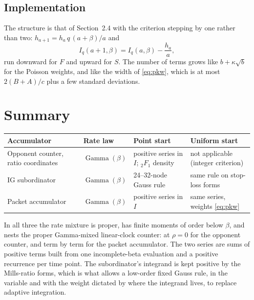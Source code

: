 \documentclass[11pt]{article}
\newcommand{\Gam}{\operatorname{Gamma}}
\newcommand{\Ireg}{I}
\begin{document}
\subsection{Implementation}
The structure is that of Section~2.4 with the criterion stepping by one rather than two: $h_{a+1}=h_a\,q\,(a+\beta)/a$ and
\[
\Ireg_q(a+1,\beta)=\Ireg_q(a,\beta)-\frac{h_a}{a},
\]
run downward for $F$ and upward for $S$. The number of terms grows like $b+\kappa\sqrt b$ for the Poisson weights, and like the width of \eqref{eq:pkw}, which is at most $2(B+A)/c$ plus a few standard deviations.

\section{Summary}
\begin{center}
\small\begin{tabular}{@{}l l p{4.2cm} p{3.6cm}@{}}
\toprule
Accumulator & Rate law & Point start & Uniform start\\
\midrule
Opponent counter, ratio coordinates & $\Gam(\beta)$ & positive series in $\Ireg$; ${}_2F_1$ density & not applicable (integer criterion)\\
IG subordinator & $\Gam(\beta)$ & 24--32-node Gauss rule & same rule on stop-loss forms\\
Packet accumulator & $\Gam(\beta)$ & positive series in $\Ireg$ & same series, weights \eqref{eq:pkw}\\
\bottomrule
\end{tabular}
\end{center}
In all three the rate mixture is proper, has finite moments of order below $\beta$, and nests the proper Gamma-mixed linear-clock counter: at $\rho=0$ for the opponent counter, and term by term for the packet accumulator. The two series are sums of positive terms built from one incomplete-beta evaluation and a positive recurrence per time point. The subordinator's integrand is kept positive by the Mills-ratio forms, which is what allows a low-order fixed Gauss rule, in the variable and with the weight dictated by where the integrand lives, to replace adaptive integration.
\end{document}
